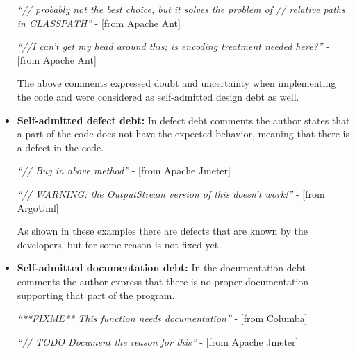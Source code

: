 \begin{itemize}
  \vspace{1mm}
  \begin{displayquote}
      \textit{``// probably not the best choice, but it solves the problem of // relative paths in CLASSPATH''} - [from Apache Ant]

      \vspace{1mm}

      \textit{``//I can't get my head around this; is encoding treatment needed here?''} - [from Apache Ant]
  \end{displayquote}
  \vspace{1mm}

The above comments expressed doubt and uncertainty when implementing the code and were considered as self-admitted design debt as well.

\item \textbf{Self-admitted defect debt:} In defect debt comments the author states that a part of the code does not have the expected behavior, meaning that there is a defect in the code. 
  
  \vspace{1mm}
  \begin{displayquote}
      \textit{``// Bug in above method''} - [from Apache Jmeter]

      \vspace{1mm}

      \textit{``// WARNING: the OutputStream version of this doesn't work!''} - [from ArgoUml]
  \end{displayquote}
  \vspace{1mm}
  
As shown in these examples there are defects that are known by the developers, but for some reason is not fixed yet. 

  \item \textbf{Self-admitted documentation debt:} In the documentation debt comments the author express that there is no proper documentation supporting that part of the program.
  
  \vspace{1mm}
  \begin{displayquote}
  	\textit{``**FIXME** This function needs documentation''} - [from Columba]
  	
  	\vspace{1mm}
  	
  	\textit{``// TODO Document the reason for this''} - [from Apache Jmeter]
  \end{displayquote}
  \vspace{1mm}
  

\end{itemize}
